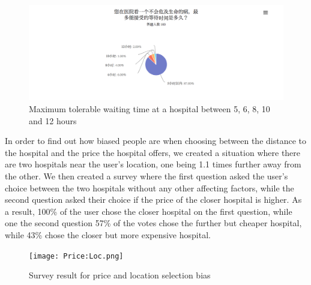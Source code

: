 \documentclass{article}
\begin{document}
\begin{appendix}
\begin{figure}[htbp]
    \centering
    \includegraphics[scale=.75]{Waiting.png}
    \caption{Maximum tolerable waiting time at a hospital between 5, 6, 8, 10 and 12 hours}
\end{figure}



\newpage
In order to find out how biased people are when choosing between the distance to the hospital and the price the hospital offers, we created a situation where there are two hospitals near the user's location, one being 1.1 times further away from the other. We then created a survey where the first question asked the user's choice between the two hospitals without any other affecting factors, while the second question asked their choice if the price of the closer hospital is higher. As a result, 100\% of the user chose the closer hospital on the first question, while one the second question 57\% of the votes chose the further but cheaper hospital, while 43\% chose the closer but more expensive hospital. 

\begin{figure}[htbp]
    \centering
    \texttt{[image: Price:Loc.png]}
    \caption{Survey result for price and location selection bias}
\end{figure}

\newpage

\end{appendix}
\end{document}
